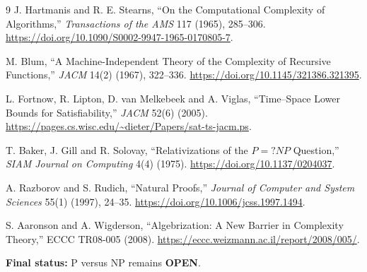 \documentclass[11pt]{article}
\newcommand{\OPEN}{\textbf{OPEN}}
\begin{document}
\begin{thebibliography}{9}
J. Hartmanis and R. E. Stearns,
``On the Computational Complexity of Algorithms,''
\emph{Transactions of the AMS} 117 (1965), 285--306.
\url{https://doi.org/10.1090/S0002-9947-1965-0170805-7}.

M. Blum, ``A Machine-Independent Theory of the Complexity of Recursive
Functions,'' \emph{JACM} 14(2) (1967), 322--336.
\url{https://doi.org/10.1145/321386.321395}.

L. Fortnow, R. Lipton, D. van Melkebeek and A. Viglas,
``Time--Space Lower Bounds for Satisfiability,'' \emph{JACM} 52(6) (2005).
\url{https://pages.cs.wisc.edu/~dieter/Papers/sat-ts-jacm.ps}.

T. Baker, J. Gill and R. Solovay, ``Relativizations of the $P=?NP$
Question,'' \emph{SIAM Journal on Computing} 4(4) (1975).
\url{https://doi.org/10.1137/0204037}.

A. Razborov and S. Rudich, ``Natural Proofs,'' \emph{Journal of Computer and
System Sciences} 55(1) (1997), 24--35.
\url{https://doi.org/10.1006/jcss.1997.1494}.

S. Aaronson and A. Wigderson, ``Algebrization: A New Barrier in Complexity
Theory,'' ECCC TR08-005 (2008).
\url{https://eccc.weizmann.ac.il/report/2008/005/}.
\end{thebibliography}

\noindent\textbf{Final status:} P versus NP remains \OPEN.

\end{document}
